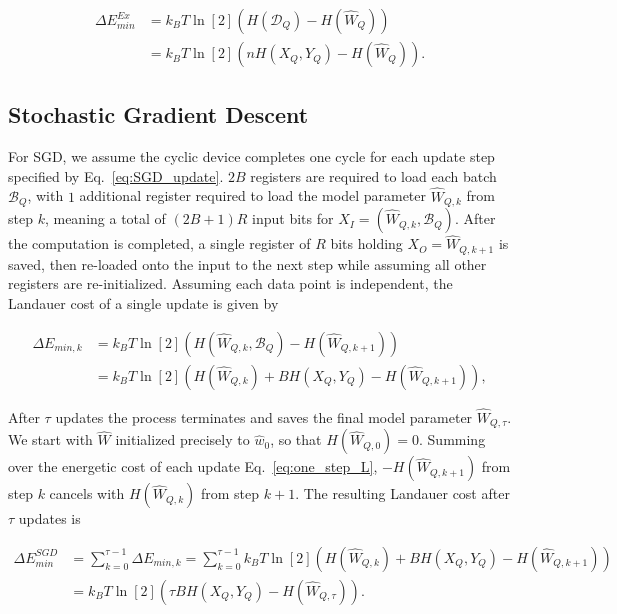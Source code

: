 \documentclass[12pt,onecolumn, margin=1in]{IEEEtran}
\newcommand{\Wh}{\hat{W}}
\newcommand{\wh}{\hat{w}}
\begin{document}
\begin{align}
    \label{eq:exact_landauer}
    \Delta E^{Ex}_{min} & = k_BT \ln[2] (H(\mathcal{D}_Q) - H(\Wh_Q)) \\ & = k_BT \ln[2] (n H(X_Q,Y_Q) - H(\Wh_Q)).
\end{align}

\subsection{Stochastic Gradient Descent}\label{sec:sgd_prelim}

For SGD, we assume the cyclic device completes one cycle for each update step specified by Eq.~\eqref{eq:SGD_update}. $2B$ registers are required to load each batch $\mathcal{B}_Q$, with $1$ additional register required to load the model parameter $\Wh_{Q,k}$ from step $k$, meaning a total of $(2B+1)R$ input bits for $X_I = (\Wh_{Q,k}, \mathcal{B}_Q)$. After the computation is completed, a single register of $R$ bits holding $X_O=\Wh_{Q,k+1}$ is saved, then re-loaded onto the input to the next step while assuming all other registers are re-initialized. Assuming each data point is independent, the Landauer cost of a single update is given by

\begin{align}
    \label{eq:one_step_L}
    \Delta E_{min,k} &  = k_BT \ln[2](H(\Wh_{Q,k}, \mathcal{B}_Q) - H(\Wh_{Q,k+1})) \\ & = k_BT \ln[2](H(\Wh_{Q,k}) + B H(X_Q,Y_Q) - H(\Wh_{Q,k+1})),
\end{align}

After $\tau$ updates the process terminates and saves the final model parameter $\hat W_{Q,\tau}$. We start with $\Wh$ initialized precisely to $\wh_0$, so that $H(\Wh_{Q,0}) = 0$. Summing over the energetic cost of each update Eq.~\eqref{eq:one_step_L}, $-H(\Wh_{Q,k+1})$ from step $k$ cancels with $H(\Wh_{Q,k})$ from step $k+1$. The resulting Landauer cost after $\tau$ updates is

\begin{equation}
    \begin{aligned}
        \Delta E^{SGD}_{min} & = \sum_{k=0}^{\tau-1} \Delta E_{min,k} = \sum_{k=0}^{\tau-1} k_BT \ln[2](H(\Wh_{Q,k}) + B H(X_Q,Y_Q) - H(\Wh_{Q,k+1})) \\
        & = k_BT \ln[2](\tau B H(X_Q,Y_Q) - H(\Wh_{Q,\tau})).
    \end{aligned}
\end{equation}
\end{document}
